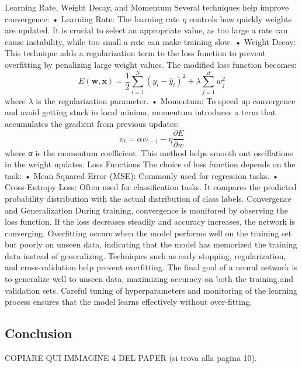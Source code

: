 Learning Rate, Weight Decay, and Momentum
Several techniques help improve convergence:
    • Learning Rate: The learning rate $\eta$ controls how quickly weights are updated. It is crucial to select an appropriate value, as too large a rate can cause instability, while too small a rate can make training slow.
    • Weight Decay: This technique adds a regularization term to the loss function to prevent overfitting by penalizing large weight values. The modified loss function becomes:
\begin{equation}
    E(\mathbf{w}, \mathbf{x}) = \frac{1}{2} \sum_{i=1}^{N} (y_i - \hat{y}_i)^2 + \lambda \sum_{j=1}^{d} w_j^2
\end{equation}
where $\lambda$ is the regularization parameter.
    • Momentum: To speed up convergence and avoid getting stuck in local minima, momentum introduces a term that accumulates the gradient from previous updates:
\begin{equation}
    v_t = \alpha v_{t-1} - \eta \frac{\partial E}{\partial w}
\end{equation}
where α is the momentum coefficient. This method helps smooth out oscillations in the weight updates.
Loss Functions
The choice of loss function depends on the task:
    • Mean Squared Error (MSE): Commonly used for regression tasks.
    • Cross-Entropy Loss: Often used for classification tasks. It compares the predicted probability distribution with the actual distribution of class labels.
Convergence and Generalization
During training, convergence is monitored by observing the loss function. If the loss decreases steadily and accuracy increases, the network is converging. Overfitting occurs when the model performs well on the training set but poorly on unseen data, indicating that the model has memorized the training data instead of generalizing. Techniques such as early stopping, regularization, and cross-validation help prevent overfitting.
The final goal of a neural network is to generalize well to unseen data, maximizing accuracy on both the training and validation sets. Careful tuning of hyperparameters and monitoring of the learning process ensures that the model learns effectively without over-fitting.

\subsection{Conclusion}
COPIARE QUI IMMAGINE 4 DEL PAPER \cite{10.11648/j.ajnna.20190501.12} (si trova alla pagina 10).

